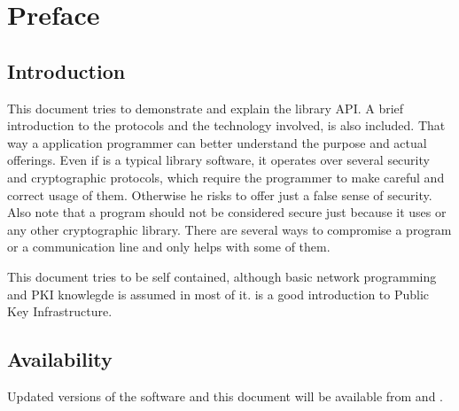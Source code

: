 \chapter*{Preface}

\section*{Introduction}
This document tries to demonstrate and explain the \gnutls{} library API.
A brief introduction to the protocols and the technology involved, is
also included. That way a \tls{} application programmer can better understand
the \gnutls{} purpose and actual offerings. 
Even if \gnutls{} is a typical library software, it operates over several
security and cryptographic protocols, which require the programmer
to make careful and correct usage of them. Otherwise he risks to offer
just a false sense of security. Also note that a program should not be
considered secure just because it uses \gnutls{} or any other cryptographic library.
There are several ways to compromise a program or a communication line
and \gnutls{} only helps with some of them. 
\par
This document tries to be self contained, although basic 
network programming and PKI knowlegde is assumed in most of it. 
\cite{GUTPKI} is a good introduction to Public Key Infrastructure.

\section*{Availability}
Updated versions of the \gnutls{} software and this document will
be available from
and .

